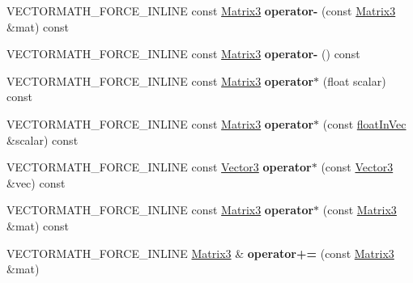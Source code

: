 \begin{DoxyCompactItemize}
V\+E\+C\+T\+O\+R\+M\+A\+T\+H\+\_\+\+F\+O\+R\+C\+E\+\_\+\+I\+N\+L\+I\+NE const \hyperlink{classVectormath_1_1Aos_1_1Matrix3}{Matrix3} {\bfseries operator-\/} (const \hyperlink{classVectormath_1_1Aos_1_1Matrix3}{Matrix3} \&mat) const
\item 
\mbox{\label{classVectormath_1_1Aos_1_1Matrix3_a4e3095347e8a34de1136fe847e6a4783}} 
V\+E\+C\+T\+O\+R\+M\+A\+T\+H\+\_\+\+F\+O\+R\+C\+E\+\_\+\+I\+N\+L\+I\+NE const \hyperlink{classVectormath_1_1Aos_1_1Matrix3}{Matrix3} {\bfseries operator-\/} () const
\item 
\mbox{\label{classVectormath_1_1Aos_1_1Matrix3_a5661faaa7682489bb641c449a4cf0f3e}} 
V\+E\+C\+T\+O\+R\+M\+A\+T\+H\+\_\+\+F\+O\+R\+C\+E\+\_\+\+I\+N\+L\+I\+NE const \hyperlink{classVectormath_1_1Aos_1_1Matrix3}{Matrix3} {\bfseries operator$\ast$} (float scalar) const
\item 
\mbox{\label{classVectormath_1_1Aos_1_1Matrix3_a364d5ecc6016ed7007adf39ebdfc6253}} 
V\+E\+C\+T\+O\+R\+M\+A\+T\+H\+\_\+\+F\+O\+R\+C\+E\+\_\+\+I\+N\+L\+I\+NE const \hyperlink{classVectormath_1_1Aos_1_1Matrix3}{Matrix3} {\bfseries operator$\ast$} (const \hyperlink{classVectormath_1_1floatInVec}{float\+In\+Vec} \&scalar) const
\item 
\mbox{\label{classVectormath_1_1Aos_1_1Matrix3_af6a8d61a7e89af4b747e4b8d642e6fe8}} 
V\+E\+C\+T\+O\+R\+M\+A\+T\+H\+\_\+\+F\+O\+R\+C\+E\+\_\+\+I\+N\+L\+I\+NE const \hyperlink{classVectormath_1_1Aos_1_1Vector3}{Vector3} {\bfseries operator$\ast$} (const \hyperlink{classVectormath_1_1Aos_1_1Vector3}{Vector3} \&vec) const
\item 
\mbox{\label{classVectormath_1_1Aos_1_1Matrix3_a8aa941e77da62bae02460d4a187963e9}} 
V\+E\+C\+T\+O\+R\+M\+A\+T\+H\+\_\+\+F\+O\+R\+C\+E\+\_\+\+I\+N\+L\+I\+NE const \hyperlink{classVectormath_1_1Aos_1_1Matrix3}{Matrix3} {\bfseries operator$\ast$} (const \hyperlink{classVectormath_1_1Aos_1_1Matrix3}{Matrix3} \&mat) const
\item 
\mbox{\label{classVectormath_1_1Aos_1_1Matrix3_a1b9b7766e7b99453297660db121c5af7}} 
V\+E\+C\+T\+O\+R\+M\+A\+T\+H\+\_\+\+F\+O\+R\+C\+E\+\_\+\+I\+N\+L\+I\+NE \hyperlink{classVectormath_1_1Aos_1_1Matrix3}{Matrix3} \& {\bfseries operator+=} (const \hyperlink{classVectormath_1_1Aos_1_1Matrix3}{Matrix3} \&mat)

\end{DoxyCompactItemize}
